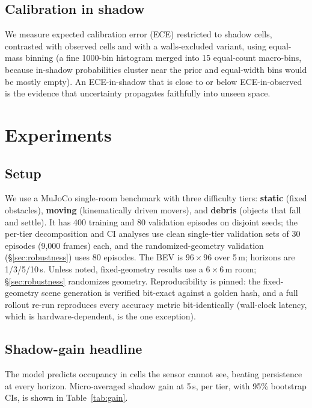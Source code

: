 \documentclass{article}
\begin{document}
\subsection{Calibration in shadow}
\label{sec:calib-method}

We measure expected calibration error (ECE) restricted to shadow cells, contrasted with observed
cells and with a walls-excluded variant, using equal-mass binning (a fine 1000-bin histogram merged
into 15 equal-count macro-bins, because in-shadow probabilities cluster near the prior and
equal-width bins would be mostly empty). An ECE-in-shadow that is close to or below ECE-in-observed
is the evidence that uncertainty propagates faithfully into unseen space.

\section{Experiments}
\label{sec:experiments}

\subsection{Setup}
\label{sec:setup}

We use a MuJoCo single-room benchmark with three difficulty tiers: \textbf{static} (fixed obstacles),
\textbf{moving} (kinematically driven movers), and \textbf{debris} (objects that fall and settle).
It has 400 training and 80 validation episodes on disjoint seeds; the per-tier decomposition and CI
analyses use clean single-tier validation sets of 30 episodes (9{,}000 frames) each, and the
randomized-geometry validation (\S\ref{sec:robustness}) uses 80 episodes. The BEV is $96\times96$ over 5\,m; horizons are
1/3/5/10\,s. Unless noted, fixed-geometry results use a $6\times6$\,m room; \S\ref{sec:robustness} randomizes geometry.
Reproducibility is pinned: the fixed-geometry scene generation is verified bit-exact against a
golden hash, and a full rollout re-run reproduces every accuracy metric bit-identically
(wall-clock latency, which is hardware-dependent, is the one exception).

\subsection{Shadow-gain headline}
\label{sec:headline}

The model predicts occupancy in cells the sensor cannot see, beating persistence at every horizon.
Micro-averaged shadow gain at 5\,s, per tier, with 95\% bootstrap CIs, is shown in
Table~\ref{tab:gain}.
\end{document}
